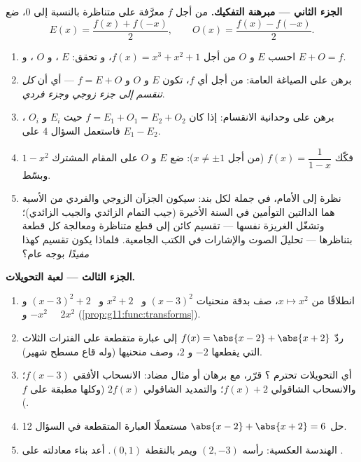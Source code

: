 \begin{problem}
\medskip
\noindent\textbf{الجزء الثاني --- مبرهنة التفكيك.}
من أجل  $f$ معرَّفة على  متناظرة بالنسبة إلى $0$، ضع
\[
E(x) = \frac{f(x) + f(-x)}{2},
\qquad
O(x) = \frac{f(x) - f(-x)}{2} .
\]
\begin{enumerate}[resume]
  \item احسب $E$ و $O$ من أجل $f(x) = x^3 + x^2 + 1$، و
        تحقق: $E$ ، و $O$ ، و $E + O = f$.
  \item برهن على الصياغة العامة: من أجل أي $f$، تكون 
        $E$  و $O$  و $f = E + O$ --- أي أن \emph{كل
         تنقسم إلى جزء زوجي وجزء فردي}.
  \item برهن على وحدانية الانقسام: إذا كان
        $f = E_1 + O_1 = E_2 + O_2$ حيث $E_i$  و $O_i$
        ، فاستعمل السؤال 4 على $E_1 - E_2$.
  \item فكّك $f(x) = \dfrac{1}{1 - x}$ (من أجل
        $x \neq \pm 1$): ضع $E$ و $O$ على المقام
        المشترك $1 - x^2$ وبسّط.
  \item نظرة إلى الأمام، في جملة لكل بند: سيكون الجزآن الزوجي والفردي
        من  الأسية هما الدالتين التوأمين في السنة الأخيرة
        (جيب التمام الزائدي والجيب الزائدي)؛ وتشغّل
        الغريزة نفسها --- تقسيم كائن إلى قطع
        متناظرة ومعالجة كل قطعة بتناظرها --- تحليلَ
        الصوت والإشارات في الكتب الجامعية.
        فلماذا يكون تقسيم كهذا \emph{مفيدًا} بوجه عام؟
\end{enumerate}

\medskip
\noindent\textbf{الجزء الثالث --- لعبة التحويلات.}
\begin{enumerate}[resume]
  \item انطلاقًا من  $x \mapsto x^2$، صف
        بدقة منحنيات $(x - 3)^2$ و \ $x^2 + 2$ و \
        $(x - 3)^2 + 2$ و \ $-x^2$ و \ $2x^2$
        (\cref{prop:g11:func:transforms}).
  \item ردّ $f(x) = \abs{x - 2} + \abs{x + 2}$ إلى
        عبارة متقطعة على الفترات الثلاث التي يقطعها $-2$
        و $2$، وصف منحنيها (وله قاع مسطح
        شهير).
  \item أي التحويلات تحترم ؟ قرّر، مع
        برهان أو مثال مضاد: الانسحاب الأفقي
        $f(x - 3)$؛ والانسحاب الشاقولي $f(x) + 2$؛ والتمديد الشاقولي
        $2 f(x)$ (وكلها مطبقة على  $f$).
  \item حل $\abs{x - 2} + \abs{x + 2} = 6$ مستعملًا
        العبارة المتقطعة في السؤال 12.
  \item الهندسة العكسية:  رأسه $(2, -3)$
        ويمر بالنقطة $(0, 1)$. أعد بناء معادلته على
        .
\end{enumerate}


\end{problem}
